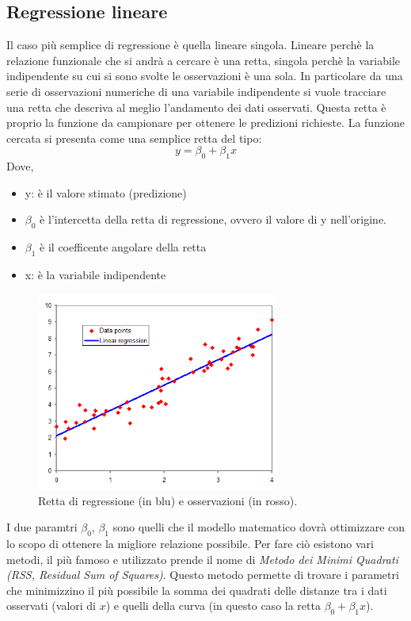 \documentclass[12pt,a4paper,openright,twoside]{report}
\begin{document}
\subsection{Regressione lineare}
Il caso più semplice di regressione è quella lineare singola. Lineare perchè la relazione funzionale che si andrà a cercare è una retta, singola perchè la variabile indipendente su cui si sono svolte le osservazioni è una sola. In particolare da una serie di osservazioni numeriche di una variabile indipendente si vuole tracciare una retta che descriva al meglio l'andamento dei dati osservati. Questa retta è proprio la funzione da campionare per ottenere le predizioni richieste. 
La funzione cercata si presenta come una semplice retta del tipo: 
\begin{equation}
    y = \beta_{0} + \beta_{1}x
\end{equation}
Dove, 
\begin{itemize}
    \item y: è il valore stimato (predizione)
    \item $\beta_{0}$ è l'intercetta della retta di regressione, ovvero il valore di y nell'origine. 
    \item $\beta_{1}$ è il coefficente angolare della retta
    \item x: è la variabile indipendente 
\end{itemize}
\begin{center}
\begin{figure}[h]
\centering
\includegraphics[width=300px,keepaspectratio]{Normdist_regression.png}
\caption{Retta di regressione (in blu) e osservazioni (in rosso). }
\end{figure}    
\end{center}
I due paramtri $\beta_{0}$, $\beta_{1}$ sono quelli che il modello matematico dovrà ottimizzare con lo scopo di ottenere la migliore relazione possibile. 
Per fare ciò esistono vari metodi, il più famoso e utilizzato prende il nome di \emph{Metodo dei Minimi Quadrati (RSS, Residual Sum of Squares)}. Questo metodo permette di trovare i parametri che minimizzino il più possibile la somma dei quadrati delle distanze tra i dati osservati (valori di $x$) e quelli della curva (in questo caso la retta $\beta_{0} + \beta_{1}x$).
\end{document}
